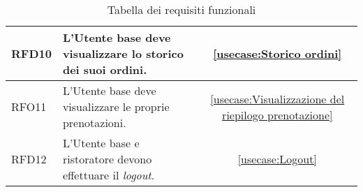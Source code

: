 \begin{table}[H]
\begin{tabularx}{\textwidth}{l|X|c}
		\hline
		RFD10       & L'Utente base deve visualizzare lo storico dei suoi ordini.                                               & \autoref{usecase:Storico ordini}                                                       \\
		\hline
		RFO11       & L'Utente base deve visualizzare le proprie prenotazioni.                                                  & \autoref{usecase:Visualizzazione del riepilogo prenotazione}                           \\
		\hline
		RFD12       & L'Utente base e ristoratore devono effettuare il \textit{logout}.                                         & \autoref{usecase:Logout}                                                               \\
	\end{tabularx}
	\caption{Tabella dei requisiti funzionali}
\end{table}

